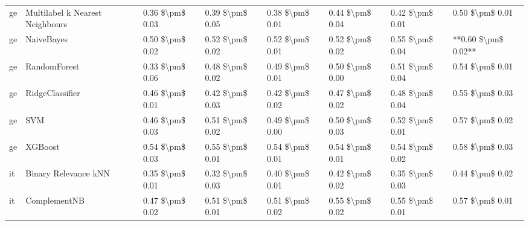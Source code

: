 \begin{tabular}{llllllll}
      ge & Multilabel k Nearest Neighbours & 0.36 \$\textbackslash pm\$ 0.03 &           0.39 \$\textbackslash pm\$ 0.05 &       0.38 \$\textbackslash pm\$ 0.01 &        0.44 \$\textbackslash pm\$ 0.04 &                         0.42 \$\textbackslash pm\$ 0.01 &     0.50 \$\textbackslash pm\$ 0.01 \\
      ge &                      NaiveBayes & 0.50 \$\textbackslash pm\$ 0.02 &           0.52 \$\textbackslash pm\$ 0.02 &       0.52 \$\textbackslash pm\$ 0.01 &        0.52 \$\textbackslash pm\$ 0.02 &                         0.55 \$\textbackslash pm\$ 0.04 & **0.60 \$\textbackslash pm\$ 0.02** \\
      ge &                    RandomForest & 0.33 \$\textbackslash pm\$ 0.06 &           0.48 \$\textbackslash pm\$ 0.02 &       0.49 \$\textbackslash pm\$ 0.01 &        0.50 \$\textbackslash pm\$ 0.00 &                         0.51 \$\textbackslash pm\$ 0.04 &     0.54 \$\textbackslash pm\$ 0.01 \\
      ge &                 RidgeClassifier & 0.46 \$\textbackslash pm\$ 0.01 &           0.42 \$\textbackslash pm\$ 0.03 &       0.42 \$\textbackslash pm\$ 0.02 &        0.47 \$\textbackslash pm\$ 0.02 &                         0.48 \$\textbackslash pm\$ 0.04 &     0.55 \$\textbackslash pm\$ 0.03 \\
      ge &                             SVM & 0.46 \$\textbackslash pm\$ 0.03 &           0.51 \$\textbackslash pm\$ 0.02 &       0.49 \$\textbackslash pm\$ 0.00 &        0.50 \$\textbackslash pm\$ 0.03 &                         0.52 \$\textbackslash pm\$ 0.01 &     0.57 \$\textbackslash pm\$ 0.02 \\
      ge &                         XGBoost & 0.54 \$\textbackslash pm\$ 0.03 &           0.55 \$\textbackslash pm\$ 0.01 &       0.54 \$\textbackslash pm\$ 0.01 &        0.54 \$\textbackslash pm\$ 0.01 &                         0.54 \$\textbackslash pm\$ 0.02 &     0.58 \$\textbackslash pm\$ 0.03 \\
      it &            Binary Relevance kNN & 0.35 \$\textbackslash pm\$ 0.01 &           0.32 \$\textbackslash pm\$ 0.03 &       0.40 \$\textbackslash pm\$ 0.01 &        0.42 \$\textbackslash pm\$ 0.02 &                         0.35 \$\textbackslash pm\$ 0.03 &     0.44 \$\textbackslash pm\$ 0.02 \\
      it &                    ComplementNB & 0.47 \$\textbackslash pm\$ 0.02 &           0.51 \$\textbackslash pm\$ 0.01 &       0.51 \$\textbackslash pm\$ 0.02 &        0.55 \$\textbackslash pm\$ 0.02 &                         0.55 \$\textbackslash pm\$ 0.01 &     0.57 \$\textbackslash pm\$ 0.01 \\

\end{tabular}
